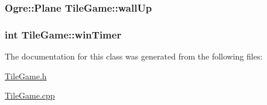 \hypertarget{classTileGame_a3679e7a4d3981c56c087f23f94b3b0ec}{
\subsubsection[{wall\-Up}]{\setlength{\rightskip}{0pt plus 5cm}Ogre\-::\-Plane Tile\-Game\-::wall\-Up\hspace{0.3cm}{\ttfamily [protected]}}}\label{classTileGame_a3679e7a4d3981c56c087f23f94b3b0ec}
\hypertarget{classTileGame_a05d9bbf0aebd4822ed518804eeb899fa}{
\subsubsection[{win\-Timer}]{\setlength{\rightskip}{0pt plus 5cm}int Tile\-Game\-::win\-Timer\hspace{0.3cm}{\ttfamily [protected]}}}\label{classTileGame_a05d9bbf0aebd4822ed518804eeb899fa}


The documentation for this class was generated from the following files\-:\begin{DoxyCompactItemize}
\item 
\hyperlink{TileGame_8h}{Tile\-Game.\-h}\item 
\hyperlink{TileGame_8cpp}{Tile\-Game.\-cpp}\end{DoxyCompactItemize}
